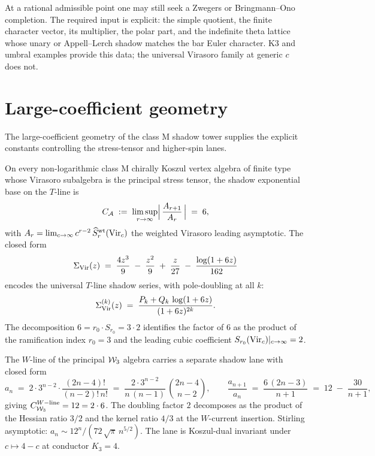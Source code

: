 \begin{remark}
\label{rem:c5-zwegers-mu-verification}
At a rational admissible point one may still seek a Zwegers or
Bringmann--Ono completion. The required input is explicit: the simple
quotient, the finite character vector, its multiplier, the polar part,
and the indefinite theta lattice whose unary or Appell--Lerch shadow
matches the bar Euler character. K3 and umbral examples provide this
data; the universal Virasoro family at generic $c$ does not.
\end{remark}

\section{Large-coefficient geometry}
\label{sec:borel-geometric}

The large-coefficient geometry of the class M shadow tower supplies
the explicit constants controlling the stress-tensor and higher-spin
lanes.

\begin{proposition}
\label{prop:universal-base-CA-six}
\ClaimStatusProvedElsewhere
On every non-logarithmic class M chirally Koszul vertex algebra of
finite type whose Virasoro subalgebra is the principal stress tensor,
the shadow exponential base on the $T$-line is
\[
C_{\mathcal{A}} \;:=\; \limsup_{r \to \infty}
\Bigl|\,\frac{A_{r+1}}{A_r}\,\Bigr|
\;=\; 6,
\]
with
$A_r = \lim_{c \to \infty} c^{r-2}\,\widehat S^{\rm wt}_r(\mathrm{Vir}_c)$
the weighted Virasoro leading asymptotic. The closed form
\[
\Sigma_{\mathrm{Vir}}(z) \;=\;
\frac{4 z^{3}}{9} \;-\; \frac{z^{2}}{9} \;+\;
\frac{z}{27} \;-\; \frac{\log(1 + 6 z)}{162}
\]
encodes the universal $T$-line shadow series, with pole-doubling at
all $k$:
\[
\Sigma_{\mathrm{Vir}}^{(k)}(z) \;=\; \frac{P_k + Q_k\,\log(1 + 6 z)}
 {(1 + 6 z)^{2 k}}.
\]
The decomposition $6 = r_0 \cdot S_{r_0} = 3 \cdot 2$ identifies the
factor of $6$ as the product of the ramification index $r_0 = 3$ and
the leading cubic coefficient $S_{r_0}(\mathrm{Vir}_c)|_{c\to\infty} = 2$.
\end{proposition}

\begin{proposition}[$\cW_3$ second lane $C^{W{\rm-line}}_{\cW_3} = 12$]
\label{prop:w3-Wline-twelve}
\ClaimStatusProvedElsewhere
The $W$-line of the principal $\cW_3$ algebra carries a separate
shadow lane with closed form
\[
a_n \;=\; 2 \cdot 3^{n-2} \cdot
\frac{(2 n - 4)!}{(n - 2)!\,n!}
\;=\; \frac{2 \cdot 3^{n-2}}{n\,(n-1)}\,
\binom{2 n - 4}{n - 2},
\qquad
\frac{a_{n+1}}{a_n} \;=\; \frac{6\,(2 n - 3)}{n + 1}
\;=\; 12 \;-\; \frac{30}{n + 1},
\]
giving $C^{W{\rm-line}}_{\mathcal{W}_3} = 12 = 2 \cdot 6$. The doubling
factor $2$ decomposes as the product of the Hessian ratio $3/2$ and
the kernel ratio $4/3$ at the $W$-current insertion. Stirling
asymptotic: $a_n \sim 12^{n}/(72\,\sqrt{\pi}\,n^{5/2})$. The lane is
Koszul-dual invariant under $c \mapsto 4 - c$ at conductor $K_3 = 4$.
\end{proposition}

